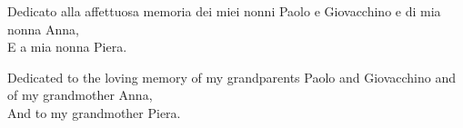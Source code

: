 \thispagestyle{empty}
{}

\vspace*{6cm}



Dedicato alla affettuosa memoria dei miei nonni Paolo e Giovacchino e di mia nonna Anna, \\
E a mia nonna Piera.\bigskip
    
Dedicated to the loving memory of my grandparents Paolo and Giovacchino and of my grandmother Anna,\\
And to my grandmother Piera.

